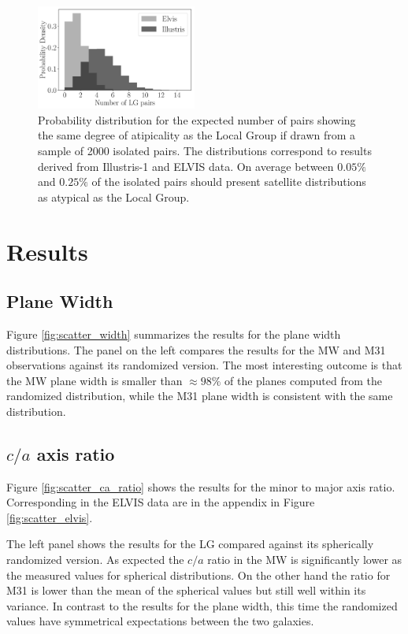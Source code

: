 \documentclass[a4paper,fleqn,usenatbib]{mnras}
\begin{document}
\begin{figure}
\centering
\includegraphics[width=0.47\textwidth]{expected_numbers.pdf}
\caption{Probability distribution for the expected number of pairs
  showing the same degree of atipicality as the Local Group if drawn
  from a sample of 2000 isolated pairs. 
  The distributions correspond to results derived from Illustris-1
  and ELVIS data.
  On average between $0.05\%$ and $0.25\%$ of the isolated pairs should present
  satellite distributions as atypical as the Local Group.
\label{fig:expected_number}}
\end{figure}

\section{Results}
\label{sec:results}


\subsection{Plane Width}

Figure \ref{fig:scatter_width} summarizes the results for the plane
width distributions.
The panel on the left compares the results for the MW and M31
observations against its randomized version. 
The most interesting outcome is that the MW plane width is smaller
than $\approx 98\%$ of the planes computed from the randomized distribution,
while the M31 plane width is consistent with the same distribution. 

\subsection{$c/a$ axis ratio}
Figure \ref{fig:scatter_ca_ratio} shows the results for the minor to
major axis ratio. 
Corresponding in the ELVIS data are in the appendix in Figure
\ref{fig:scatter_elvis}.

The left panel shows the results for the LG compared against its
spherically randomized version.
As expected the $c/a$ ratio in the MW is significantly lower as the
measured values for spherical distributions. 
On the other hand the ratio for M31 is lower than the mean of the
spherical values but still well within its variance.
In contrast to the results for the plane width, this time the
randomized values have symmetrical expectations between the two
galaxies.
\end{document}
